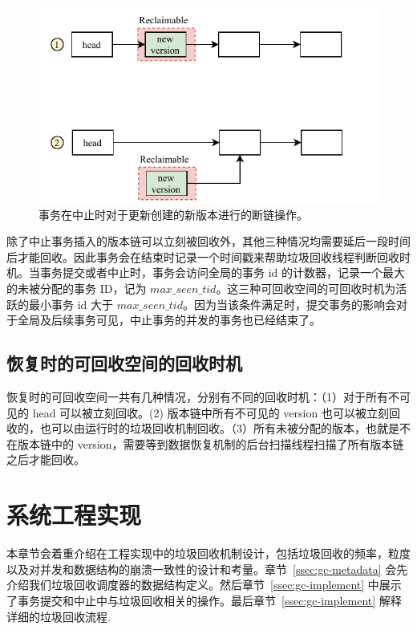 \begin{figure}
    \centering
    \includegraphics[width=1\linewidth]{figures/gc-e.pdf}
    \caption{事务在中止时对于更新创建的新版本进行的断链操作。}
    \label{fig:insert-abort}
\end{figure}

除了中止事务插入的版本链可以立刻被回收外，其他三种情况均需要延后一段时间后才能回收。因此事务会在结束时记录一个时间戳来帮助垃圾回收线程判断回收时机。当事务提交或者中止时，事务会访问全局的事务 id 的计数器，记录一个最大的未被分配的事务 ID，记为 $max\_seen\_tid$。这三种可回收空间的可回收时机为活跃的最小事务 id 大于 $max\_seen\_tid$。因为当该条件满足时，提交事务的影响会对于全局及后续事务可见，中止事务的并发的事务也已经结束了。

\subsection{恢复时的可回收空间的回收时机}

恢复时的可回收空间一共有几种情况，分别有不同的回收时机：（1）对于所有不可见的 head 可以被立刻回收。(2) 版本链中所有不可见的 version 也可以被立刻回收的，也可以由运行时的垃圾回收机制回收。（3）所有未被分配的版本，也就是不在版本链中的 version，需要等到数据恢复机制的后台扫描线程扫描了所有版本链之后才能回收。


\section{系统工程实现}
\label{sec:implement}

本章节会着重介绍在工程实现中的垃圾回收机制设计，包括垃圾回收的频率，粒度以及对并发和数据结构的崩溃一致性的设计和考量。章节~\ref{ssec:gc-metadata} 会先介绍我们垃圾回收调度器的数据结构定义。然后章节~\ref{ssec:gc-implement} 中展示了事务提交和中止中与垃圾回收相关的操作。最后章节~\ref{ssec:gc-implement} 解释详细的垃圾回收流程.

